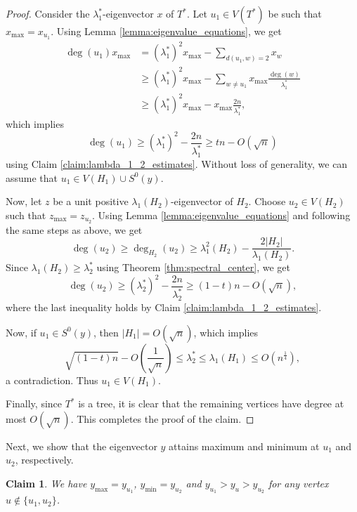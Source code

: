 \documentclass[11pt]{article}
\theoremstyle{plain}
\newtheorem{claim}{Claim}[section]
\numberwithin{equation}{section}
\begin{document}
\begin{proof}
 Consider the $\lambda_1^*$-eigenvector $x$ of $T^*$. Let $u_1\in V(T^*)$ be such that $x_{\max} = x_{u_1}$. Using Lemma \ref{lemma:eigenvalue_equations}, we get 
 \begin{align*}
    \deg(u_1)x_{\max} & = (\lambda_1^*)^2x_{\max} - \sum_{d(u_1,w) = 2} x_w \\
    & \ge (\lambda_1^*)^2x_{\max} - \sum_{w\neq u_1} x_{\max}\frac{\deg(w)}{\lambda_1^*}\\
    & \ge (\lambda_1^*)^2x_{\max} - x_{\max} \frac{2n}{\lambda_1^*},
 \end{align*}
 which implies 
 \[\deg(u_1) \ge (\lambda_1^*)^2 - \frac{2n}{\lambda_1^*} \ge tn - O(\sqrt{n})\]
 using Claim \ref{claim:lambda_1_2_estimates}. Without loss of generality, we can assume that $u_1\in V(H_1)\cup S^0(y)$.
 
 Now, let $z$ be a unit positive $\lambda_1(H_2)$-eigenvector of $H_2$. Choose $u_2\in V(H_2)$ such that $z_{\max} = z_{u_2}$. Using Lemma \ref{lemma:eigenvalue_equations} and following the same steps as above, we get 
\[ \deg(u_2)\ge \deg_{H_2}(u_2)\ge \lambda_1^2(H_2) - \frac{2|H_2|}{\lambda_1(H_2)}.\]
Since $\lambda_1(H_2)\ge \lambda_2^*$ using Theorem \ref{thm:spectral_center}, we get 
\[ \deg(u_2) \ge (\lambda_2^*)^2 - \frac{2n}{\lambda_2^*} \ge (1-t)n - O(\sqrt{n}),\]
where the last inequality holds by Claim \ref{claim:lambda_1_2_estimates}. 

Now, if $u_1\in S^0(y)$, then $|H_1|= O(\sqrt{n})$, which implies 
\[ \sqrt{(1-t)n} - O\left(\frac{1}{\sqrt{n}}\right)\le \lambda_2^* \le \lambda_1(H_1)\le O(n^{\frac{1}{4}}),\]
a contradiction. Thus $u_1\in V(H_1)$. 

Finally, since $T^*$ is a tree, it is clear that the remaining vertices have degree at most $O(\sqrt{n})$. This completes the proof of the claim.
\end{proof}

Next, we show that the eigenvector $y$ attains maximum and minimum at $u_1$ and $u_2$, respectively.

\begin{claim}\label{claim:y_max_min}
    We have $y_{\max} = y_{u_1}$, $y_{\min} = y_{u_2}$ and $y_{u_1} > y_u > y_{u_2}$ for any vertex $u\notin \{u_1, u_2\}$.
\end{claim}
\end{document}
